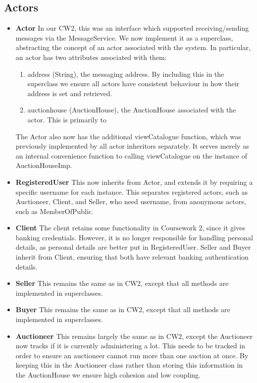 \documentclass[titlepage, 12pt]{extarticle}
\begin{document}
\subsection{Actors}
\begin{itemize}
    \item {\bf Actor} In our CW2, this was an interface which supported
        receiving/sending messages via the MessageService. We now implement it
        as a superclass, abstracting the concept of an actor associated with
        the system. In particular, an actor has two attributes associated with
        them:
        \begin{enumerate}
            \item address (String), the messaging address. By including this in
                the superclass we ensure all actors have consistent behaviour in
                how their address is set and retrieved.
            \item auctionhouse (AuctionHouse), the AuctionHouse associated with
                the actor. This is primarily to 
        \end{enumerate}
        The Actor also now has the additional viewCatalogue function, which was
        previously implemented by all actor inheritors separately. It serves
        merely as an internal convenience function to calling viewCatalogue on
        the instance of AuctionHouseImp.
    \item {\bf RegisteredUser} This now inherits from Actor, and extends it by
        requiring a specific username for each instance. This separates
        registered actors, such as Auctioneer, Client, and Seller, who need
        username, from anonymous actors, such as MemberOfPublic.
    \item {\bf Client} The client retains some functionality in Coursework 2,
        since it gives banking credentials. However, it is no longer responsible
        for handling personal details, as personal details are better put in
        RegisteredUser. Seller and Buyer inherit from Client, ensuring that both
        have relevant banking authentication details.
    \item {\bf Seller} This remains the same as in CW2, except that all methods
        are implemented in superclasses.
    \item {\bf Buyer} This remains the same as in CW2, except that all methods
        are implemented in superclasses. 
    \item {\bf Auctioneer} This remains largely the same as in CW2, except the
        Auctioneer now tracks if it is currently administering a lot. This needs
        to be tracked in order to ensure an auctioneer cannot run more than one
        auction at once. By keeping this in the Auctioneer class rather than
        storing this information in the AuctionHouse we ensure high cohesion
        and low coupling.
\end{itemize}
\end{document}
